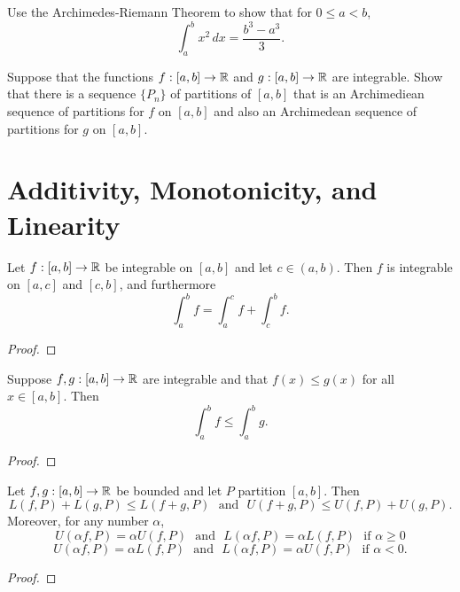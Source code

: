 \documentclass[letterpaper, twoside, 12pt]{book}
\begin{document}
\begin{exercise}[6b]
  Use the Archimedes-Riemann Theorem to show that for \(0\leq a<b\),
  \[
    \int_a^b x^2\,dx = \frac{b^3-a^3}{3}
  .\]
\end{exercise}
\begin{solution}

\end{solution}


\begin{exercise}[9]
  Suppose that the functions \(f:[a,b]\to\mathbb R\) and
  \(g:[a,b]\to\mathbb R\) are integrable. Show that there is a sequence
  \(\{P_n\}\) of partitions of \([a,b]\) that is an Archimediean sequence
  of partitions for \(f\) on \([a,b]\) and also an Archimedean sequence
  of partitions for \(g\) on \([a,b]\).
\end{exercise}
\begin{solution}

\end{solution}




\section{Additivity, Monotonicity, and Linearity}


\begin{theorem}
  Let \(f:[a,b]\to\mathbb R\) be integrable on \([a,b]\) and let \(c\in(a,b)\).
  Then \(f\) is integrable on \([a,c]\) and \([c,b]\), and furthermore
  \[
    \int_a^b f = \int_a^c f + \int_c^b f
  .\]
\end{theorem}
\begin{proof}

\end{proof}


\begin{theorem}
  Suppose \(f,g:[a,b]\to\mathbb R\) are integrable and that \(f(x)\leq g(x)\)
  for all \(x\in[a,b]\). Then
  \[
    \int_a^b f \leq \int_a^b g
  .\]
\end{theorem}
\begin{proof}

\end{proof}


\begin{lemma}[6.14]
  Let \(f,g:[a,b]\to\mathbb R\) be bounded and let \(P\) partition \([a,b]\).
  Then
  \[
    L(f,P)+L(g,P)\leq L(f+g,P)
      \text{~~and~~}
    U(f+g,P)\leq U(f,P)+U(g,P)
  .\]
  Moreover, for any number \(\alpha\),
  \[
    U(\alpha f,P)=\alpha U(f,P)
      \text{~~and~~}
    L(\alpha f,P)=\alpha L(f,P)
      \text{~~if~}
    \alpha\geq 0
  \]
  \[
    U(\alpha f,P)=\alpha L(f,P)
      \text{~~and~~}
    L(\alpha f,P)=\alpha U(f,P)
      \text{~~if~}
    \alpha< 0
  .\]
\end{lemma}
\begin{proof}

\end{proof}
\end{document}
